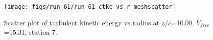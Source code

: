 \begin{figure}[H]
\centering
\texttt{[image: figs/run\_61/run\_61\_ctke\_vs\_r\_meshscatter]}
\caption{Scatter plot of turbulent kinetic energy vs radius at $z/c$=10.00, $V_{free}$=15.31, station 7.}
\end{figure}


